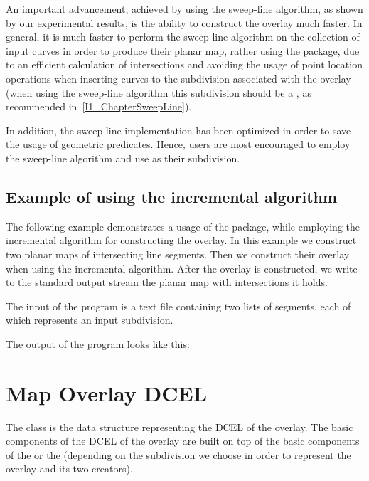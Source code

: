 \begin{ccTexOnly}
An important advancement, achieved by using the sweep-line algorithm, 
as shown by our experimental results,
is the ability to construct the overlay much faster.
In general, it is much faster to perform the sweep-line algorithm on
the collection of input curves in order to produce their planar map,
rather using the  package,
due to an efficient calculation of intersections and avoiding the usage of
point location operations when inserting curves to the subdivision associated with the overlay
(when using the sweep-line algorithm this subdivision 
should be a , as recommended in~\ref{I1_ChapterSweepLine}).

In addition, the sweep-line implementation has been optimized in order to
save the usage of geometric predicates. 
Hence, users are most encouraged to employ the sweep-line algorithm 
and use  as their subdivision. 

\subsection*{Example of using the incremental algorithm}
The following example demonstrates a usage of the 
 package, 
while employing the incremental algorithm for constructing the overlay.
In this example we construct two planar maps of intersecting line segments. 
Then we construct their overlay when using the incremental algorithm. 
After the overlay is constructed, we write to the standard output stream 
the planar map with intersections it holds. 

The input of the program is a text file containing two lists of segments, 
each of which represents an input subdivision.

The output of the program looks like this:

\section{Map Overlay DCEL}
The 
class is the data structure representing the DCEL of the overlay. 
The basic components of the DCEL of the overlay are built 
on top of the basic components of the  or 
the  
(depending on the subdivision we choose in order to represent the overlay and its 
two creators).


\end{ccTexOnly}
